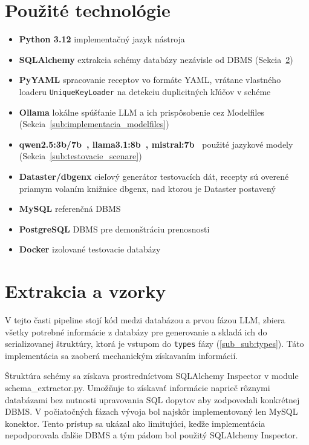 \section{Použité technológie}
\label{sub:pouzite_technologie}

\begin{itemize}
    \item \textbf{Python 3.12} implementačný jazyk nástroja
    \item \textbf{SQLAlchemy} extrakcia schémy databázy nezávisle od DBMS (Sekcia~\ref{sub:extrakcia_a_vzorky})
    \item \textbf{PyYAML} spracovanie receptov vo formáte YAML, vrátane vlastného loaderu \newline \texttt{UniqueKeyLoader} na detekciu duplicitných kľúčov v schéme
    \item \textbf{Ollama} lokálne spúšťanie LLM a ich prispôsobenie cez Modelfiles (Sekcia~\ref{sub:implementacia_modelfiles})
    \item \textbf{qwen2.5:3b/7b~\cite{Qwen2025}, llama3.1:8b~\cite{Llama2024}, mistral:7b~\cite{Mistral7b}} použité jazykové modely (Sekcia~\ref{sub:testovacie_scenare})
    \item \textbf{Dataster/dbgenx} cieľový generátor testovacích dát, recepty sú overené priamym volaním knižnice dbgenx, nad ktorou je Dataster postavený
    \item \textbf{MySQL} referenčná DBMS
    \item \textbf{PostgreSQL} DBMS pre demonštráciu prenosnosti
    \item \textbf{Docker} izolované testovacie databázy
    
\end{itemize}

\section{Extrakcia a vzorky}
\label{sub:extrakcia_a_vzorky}

V tejto časti pipeline stojí kód medzi databázou a prvou fázou LLM, zbiera všetky potrebné informácie z databázy pre generovanie a skladá ich do serializovanej štruktúry, ktorá je vstupom do \texttt{types} fázy (\ref{sub_sub:types}). Táto implementácia  sa zaoberá mechanickým získavaním informácií.


Štruktúra schémy sa získava prostredníctvom SQLAlchemy Inspector v module \newline schema\_extractor.py. Umožňuje to získavať informácie naprieč rôznymi databázami bez nutnosti upravovania SQL dopytov aby zodpovedali konkrétnej {DBMS}. V počiatočných fázach vývoja bol najskôr implementovaný len MySQL konektor. Tento prístup sa ukázal ako limitujúci, keďže implementácia nepodporovala ďalšie {DBMS} a tým pádom bol použitý SQLAlchemy Inspector.


